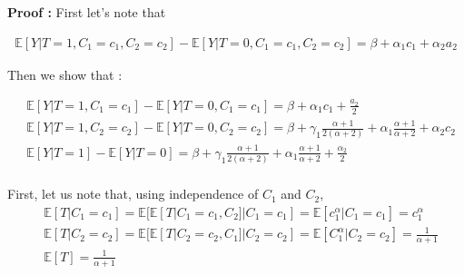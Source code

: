 \documentclass{article}
\theoremstyle{plain}
\theoremstyle{definition}
\theoremstyle{remark}
\theoremstyle{mystyle}
\begin{document}
\textbf{Proof :} First let's note that

\begin{align*}
    \mathbb{E}[Y|T=1,C_1=c_1,C_2=c_2] - \mathbb{E}[Y|T=0,C_1=c_1,C_2=c_2] = \beta + \alpha_1c_1 + \alpha_2a_2
\end{align*}


Then we show that :

\begin{align*}
    &\mathbb{E}[Y|T=1,C_1=c_1] - \mathbb{E}[Y|T=0,C_1=c_1] = \beta + \alpha_1c_1 + \frac{a_2}{2} \\
    &\mathbb{E}[Y|T=1,C_2=c_2] - \mathbb{E}[Y|T=0,C_2=c_2] = \beta + \gamma_1\frac{\alpha+1}{2(\alpha+2)} + \alpha_1\frac{\alpha+1}{\alpha+2} + \alpha_2c_2 \\
    &\mathbb{E}[Y|T=1] - \mathbb{E}[Y|T=0] = \beta + \gamma_1\frac{\alpha + 1}{2(\alpha + 2)} + \alpha_1\frac{\alpha+1}{\alpha+2} + \frac{\alpha_2}{2}   \\
\end{align*}



First, let us note that, using independence of $C_1$ and $C_2$,
\begin{align*}
    &\mathbb{E}[T|C_1=c_1] =  \mathbb{E}[\mathbb{E}[T|C_1=c_1,C_2]|C_1=c_1] = \mathbb{E}[ c_1^\alpha |C_1=c_1] = c_1^\alpha \\
    &\mathbb{E}[T|C_2=c_2] =  \mathbb{E}[\mathbb{E}[T|C_2=c_2,C_1]|C_2=c_2] = \mathbb{E}[ C_1^\alpha |C_2=c_2] = \frac{1}{\alpha+1} \\
    &\mathbb{E}[T] = \frac{1}{\alpha+1}
\end{align*}
\end{document}
